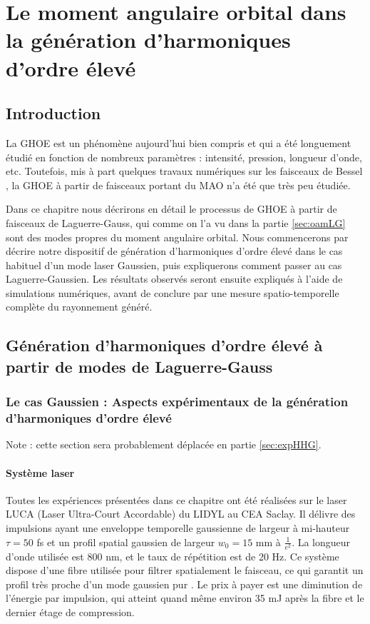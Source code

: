 \part{Le moment angulaire orbital dans la génération d'harmoniques d'ordre élevé}
\label{CH:OAM_HHG}
\chapter{Introduction}
La GHOE est un phénomène aujourd'hui bien compris et qui a été longuement étudié en fonction de nombreux paramètres : intensité, pression, longueur d'onde, etc. Toutefois, mis à part quelques travaux numériques sur les faisceaux de Bessel , la GHOE à partir de faisceaux portant du MAO n'a été que très peu étudiée. 

Dans ce chapitre nous décrirons en détail le processus de GHOE à partir de faisceaux de Laguerre-Gauss, qui comme on l'a vu dans la partie \ref{sec:oamLG} sont des modes propres du moment angulaire orbital. Nous commencerons par décrire notre dispositif de génération d'harmoniques d'ordre élevé dans le cas habituel d'un mode laser Gaussien, puis expliquerons comment passer au cas Laguerre-Gaussien. Les résultats observés seront ensuite expliqués à l'aide de simulations numériques, avant de conclure par une mesure spatio-temporelle complète du rayonnement généré. 

\newpage
\chapter{Génération d'harmoniques d'ordre élevé à partir de modes de Laguerre-Gauss}
\section{Le cas Gaussien : Aspects expérimentaux de la génération d'harmoniques d'ordre élevé}
\label{Sec:HHG_G}
Note : cette section sera probablement déplacée en partie \ref{sec:expHHG}.
\subsection{Système laser}
Toutes les expériences présentées dans ce chapitre ont été réalisées sur le laser LUCA (Laser Ultra-Court Accordable) du LIDYL au CEA Saclay. Il délivre des impulsions ayant une enveloppe temporelle gaussienne de largeur à mi-hauteur $\tau = 50$ fs et un profil spatial gaussien de largeur $w_0 = 15$ mm à $\frac{1}{e^2}$. La longueur d'onde utilisée est 800 nm, et le taux de répétition est de 20 Hz. Ce système dispose d'une fibre utilisée pour filtrer spatialement le faisceau, ce qui garantit un profil très proche d'un mode gaussien pur . Le prix à payer est une diminution de l'énergie par impulsion, qui atteint quand même environ 35 mJ après la fibre et le dernier étage de compression.

